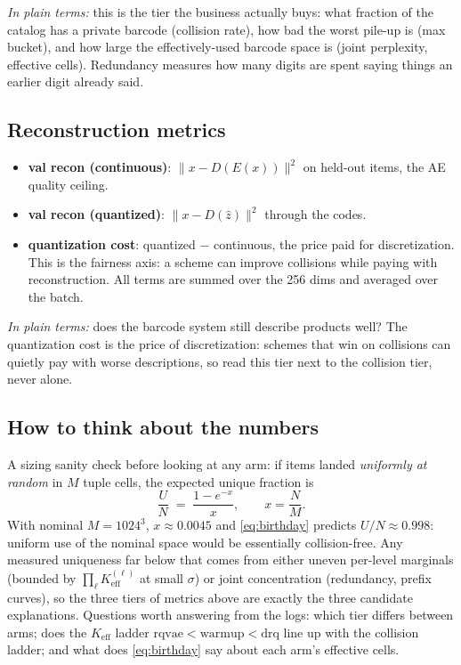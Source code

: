 \documentclass[11pt]{article}
\newcommand{\Keff}{K_{\mathrm{eff}}}
\begin{document}
\emph{In plain terms:} this is the tier the business actually buys: what
fraction of the catalog has a private barcode (collision rate), how bad the
worst pile-up is (max bucket), and how large the effectively-used barcode space
is (joint perplexity, effective cells). Redundancy measures how many digits are
spent saying things an earlier digit already said.

\subsection{Reconstruction metrics}

\begin{itemize}[nosep]
  \item \textbf{val recon (continuous)}: $\|x - D(E(x))\|^2$ on held-out items,
  the AE quality ceiling.
  \item \textbf{val recon (quantized)}: $\|x - D(\hat z)\|^2$ through the codes.
  \item \textbf{quantization cost}: quantized $-$ continuous, the price paid for
  discretization. This is the fairness axis: a scheme can improve collisions
  while paying with reconstruction. All terms are summed over the 256 dims and
  averaged over the batch.
\end{itemize}

\emph{In plain terms:} does the barcode system still describe products well?
The quantization cost is the price of discretization: schemes that win on
collisions can quietly pay with worse descriptions, so read this tier next to
the collision tier, never alone.

\subsection{How to think about the numbers}

A sizing sanity check before looking at any arm: if items landed
\emph{uniformly at random} in $M$ tuple cells, the expected unique fraction is
\begin{equation}
  \frac{U}{N} \;=\; \frac{1 - e^{-x}}{x}, \qquad x = \frac{N}{M}.
  \label{eq:birthday}
\end{equation}
With nominal $M = 1024^3$, $x \approx 0.0045$ and \eqref{eq:birthday} predicts
$U/N \approx 0.998$: uniform use of the nominal space would be essentially
collision-free. Any measured uniqueness far below that comes from either
uneven per-level marginals (bounded by $\prod_\ell \Keff^{(\ell)}$ at small
$\sigma$) or joint concentration (redundancy, prefix curves), so the three
tiers of metrics above are exactly the three candidate explanations. Questions
worth answering from the logs: which tier differs between arms; does the
$\Keff$ ladder $\mathrm{rqvae} < \mathrm{warmup} < \mathrm{drq}$ line up with
the collision ladder; and what does \eqref{eq:birthday} say about each arm's
effective cells.
\end{document}
